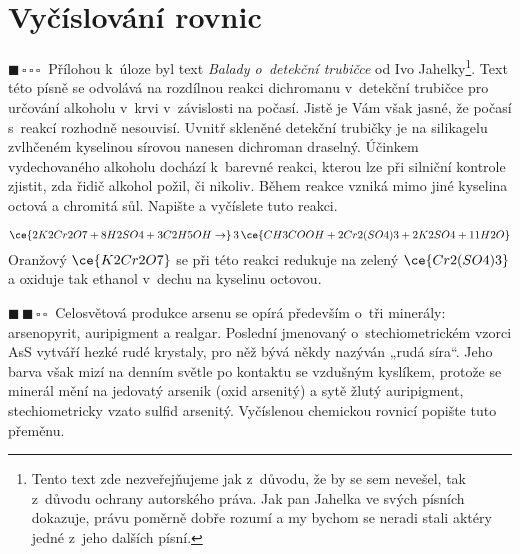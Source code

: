 \documentclass{book}
\newcommand{\jeden}{$\blacksquare \, \square \, \square \, \square \; \; $}
\newcommand{\dva}{$\blacksquare \, \blacksquare \, \square \, \square \; \; $}
\renewenvironment{quotation}{\par}{\par} %
\begin{document}
\section{Vyčíslování rovnic}

\begin{quotation}
\jeden Přílohou k~úloze byl text \textit{Balady o~detekční trubičce} od Ivo Jahelky\footnote{
Tento text zde nezveřejňujeme jak z~důvodu,
že by se sem nevešel, tak z~důvodu ochrany autorského práva. Jak pan
Jahelka ve svých písních dokazuje, právu poměrně dobře rozumí a my
bychom se neradi stali aktéry jedné z~jeho dalších písní.}. Text této písně se odvolává na rozdílnou reakci dichromanu v~detekční trubičce pro určování alkoholu v~krvi v~závislosti
na počasí. Jistě je Vám však jasné, že počasí s~reakcí rozhodně nesouvisí. Uvnitř skleněné detekční trubičky je na silikagelu zvlhčeném kyselinou
sírovou nanesen dichroman draselný. Účinkem vydechovaného alkoholu
dochází k~barevné reakci, kterou lze při silniční kontrole zjistit,
zda řidič alkohol požil, či nikoliv. Během reakce vzniká mimo jiné
kyselina octová a chromitá sůl. Napište a vyčíslete tuto reakci.
\end{quotation} \dotfill \par 
\[
\ce{2K2Cr2O7 + 8H2SO4 + 3C2H5OH \rightarrow} \, 3\, \ce{CH3COOH + 2Cr2(SO4)3 + 2K2SO4 + 11H2O}
\]
Oranžový $\ce{K2Cr2O7}$ se při této reakci redukuje na zelený $\ce{Cr2(SO4)3}$
a oxiduje tak ethanol v~dechu na kyselinu octovou.

\newpage %
\begin{quotation}
\dva Celosvětová produkce arsenu se opírá především o~tři minerály: arsenopyrit,
auripigment a realgar. Poslední jmenovaný o~stechiometrickém vzorci AsS vytváří
hezké rudé krystaly, pro něž bývá někdy nazýván „rudá síra“. Jeho
barva však mizí na denním světle po kontaktu se vzdušným kyslíkem,
protože se minerál mění na jedovatý arsenik (oxid arsenitý) a sytě
žlutý auripigment, stechiometricky vzato sulfid arsenitý. Vyčíslenou
chemickou rovnicí popište tuto přeměnu.
\end{quotation} \dotfill \par 
\end{document}

